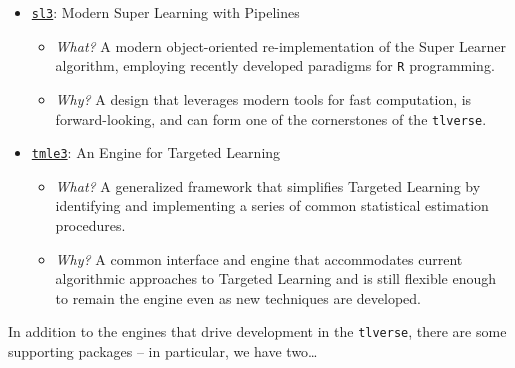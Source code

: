 \documentclass[12pt, krantz2,]{krantz}
\newcommand{\passthrough}[1]{#1}
\providecommand{\tightlist}{%
  \setlength{\itemsep}{0pt}\setlength{\parskip}{0pt}}
\theoremstyle{definition}
\theoremstyle{definition}
\theoremstyle{definition}
\newcommand{\1}{\mathbbm{1}}
\begin{document}
\begin{itemize}
\tightlist
\item
  \href{https://github.com/tlverse/sl3}{\passthrough{\lstinline!sl3!}}: Modern Super Learning with Pipelines

  \begin{itemize}
  \tightlist
  \item
    \emph{What?} A modern object-oriented re-implementation of the Super Learner
    algorithm, employing recently developed paradigms for \passthrough{\lstinline!R!} programming.
  \item
    \emph{Why?} A design that leverages modern tools for fast computation, is
    forward-looking, and can form one of the cornerstones of the \passthrough{\lstinline!tlverse!}.
  \end{itemize}
\item
  \href{https://github.com/tlverse/tmle3}{\passthrough{\lstinline!tmle3!}}: An Engine for Targeted Learning

  \begin{itemize}
  \tightlist
  \item
    \emph{What?} A generalized framework that simplifies Targeted Learning by
    identifying and implementing a series of common statistical estimation
    procedures.
  \item
    \emph{Why?} A common interface and engine that accommodates current algorithmic
    approaches to Targeted Learning and is still flexible enough to remain the
    engine even as new techniques are developed.
  \end{itemize}
\end{itemize}

In addition to the engines that drive development in the \passthrough{\lstinline!tlverse!}, there are
some supporting packages -- in particular, we have two\ldots{}
\end{document}
